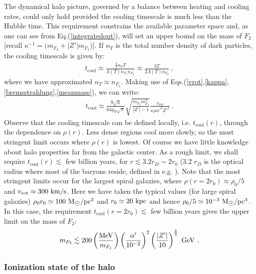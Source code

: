 \documentclass[12pt]{article}
\begin{document}
{{The dynamical halo picture, governed by a balance between heating and cooling rates, could only hold provided the cooling timescale is much less than the Hubble time. This requirement constrains the available parameter space and, as one can see from Eq.(\ref{integratedout}), will set an upper bound on the mass of $F_2$ [recall $\kappa ^{-1} = (m _{F_2} + |Z'|m _{F_1}$)]. If $n _T$ is the total number density of dark particles, the cooling timescale is given by:
%
\begin{eqnarray}
t _{\text{cool}} \approx \frac{\frac{3}{2}n _TT}{\Lambda (T)n _{F_1}n _{F_2}} \approx \frac{3T}{2\Lambda (T)n _{F_2}} \ ,
\label{cooling}
\end{eqnarray}
%
where we have approximated $n _T \approx n _{F_1}$. Making use of Eqs.(\ref{vrot},\ref{kappa},\ref{bremsstrahlung},\ref{meanmass}), we can write:
%
\begin{eqnarray}
t _{\text{cool}} \approx \frac{9\sqrt{3}}{64\overline{g} _B\sqrt{\pi}}\sqrt{\frac{m _{F_2}m _{F_1} ^3}{|Z'|-1}}\frac{v _{\text{rot}}}{\kappa \rho {\alpha '} ^3{Z'} ^2} \ .
\end{eqnarray}
%
Observe that the cooling timescale can be defined locally, i.e. $t _{\text{cool}}(r)$, through the dependence on $\rho (r)$. Less dense regions cool more slowly, so the most stringent limit occurs where $\rho (r)$ is lowest. Of course we have little knowledge about halo properties far from the galactic center. As a rough limit, we shall require  $t _{\text{cool}}(r) \lesssim$ few billion years, for $r \lesssim 3.2 r _D \sim 2 r _0$ (3.2 $r _D$ is the optical radius where most of the baryons reside, defined in e.g. \cite{optical}). Note that the most stringent limits occur for the largest spiral galaxies, where $\rho (r=2r _0) \approx \rho _0/5$ and $v _{\text{rot}} \approx 300 \ \rm km/s$. Here we have taken the typical values (for large spiral galaxies) $\rho _0r _0 \simeq 100 \ \rm M _{\astrosun}/pc ^2$ and $r _0 \simeq 20 \ \rm kpc$ and hence $\rho _0/5 \simeq 10 ^{-3} \ {\rm M _{\astrosun}/pc ^3}$. In this case, the requirement $t _{\text{cool}} (r=2r _0) \lesssim$ few billion years gives the upper limit on the mass of $F_2$:
%
\begin{eqnarray}
m _{F_2} \lesssim 200 \left ( \frac{\rm MeV}{m _{F_1}} \right )\left ( \frac{\alpha '}{10 ^{-2}} \right ) ^2\left ( \frac{|Z'|}{10} \right ) ^{\frac{5}{3}} \ \rm GeV \ .
\label{mf2cool}
\end{eqnarray}
%

\subsubsection{Ionization state of the halo}

}}
\end{document}
